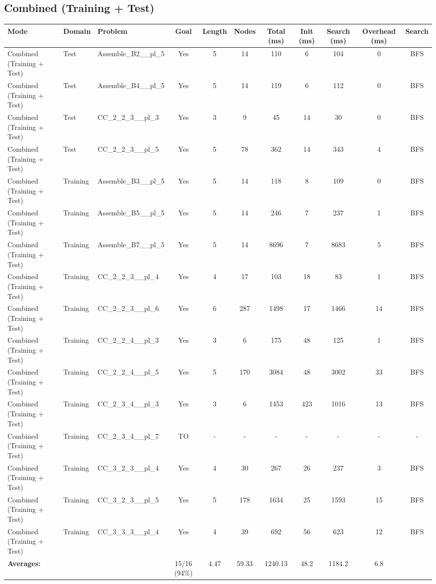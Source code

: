 \documentclass{article}
\begin{document}
\subsection*{Combined (Training + Test)}
\begin{tabular}{lllcccccccc}
\toprule
Mode & Domain & Problem & Goal & Length & Nodes & Total (ms) & Init (ms) & Search (ms) & Overhead (ms) & Search \\
\midrule
Combined (Training + Test) & Test & Assemble\_B2\_\_pl\_5 & Yes & 5 & 14 & 110 & 6 & 104 & 0 & BFS \\
Combined (Training + Test) & Test & Assemble\_B4\_\_pl\_5 & Yes & 5 & 14 & 119 & 6 & 112 & 0 & BFS \\
Combined (Training + Test) & Test & CC\_2\_2\_3\_\_pl\_3 & Yes & 3 & 9 & 45 & 14 & 30 & 0 & BFS \\
Combined (Training + Test) & Test & CC\_2\_2\_3\_\_pl\_5 & Yes & 5 & 78 & 362 & 14 & 343 & 4 & BFS \\
Combined (Training + Test) & Training & Assemble\_B3\_\_pl\_5 & Yes & 5 & 14 & 118 & 8 & 109 & 0 & BFS \\
Combined (Training + Test) & Training & Assemble\_B5\_\_pl\_5 & Yes & 5 & 14 & 246 & 7 & 237 & 1 & BFS \\
Combined (Training + Test) & Training & Assemble\_B7\_\_pl\_5 & Yes & 5 & 14 & 8696 & 7 & 8683 & 5 & BFS \\
Combined (Training + Test) & Training & CC\_2\_2\_3\_\_pl\_4 & Yes & 4 & 17 & 103 & 18 & 83 & 1 & BFS \\
Combined (Training + Test) & Training & CC\_2\_2\_3\_\_pl\_6 & Yes & 6 & 287 & 1498 & 17 & 1466 & 14 & BFS \\
Combined (Training + Test) & Training & CC\_2\_2\_4\_\_pl\_3 & Yes & 3 & 6 & 175 & 48 & 125 & 1 & BFS \\
Combined (Training + Test) & Training & CC\_2\_2\_4\_\_pl\_5 & Yes & 5 & 170 & 3084 & 48 & 3002 & 33 & BFS \\
Combined (Training + Test) & Training & CC\_2\_3\_4\_\_pl\_3 & Yes & 3 & 6 & 1453 & 423 & 1016 & 13 & BFS \\
Combined (Training + Test) & Training & CC\_2\_3\_4\_\_pl\_7 & TO & - & - & - & - & - & - & - \\
Combined (Training + Test) & Training & CC\_3\_2\_3\_\_pl\_4 & Yes & 4 & 30 & 267 & 26 & 237 & 3 & BFS \\
Combined (Training + Test) & Training & CC\_3\_2\_3\_\_pl\_5 & Yes & 5 & 178 & 1634 & 25 & 1593 & 15 & BFS \\
Combined (Training + Test) & Training & CC\_3\_3\_3\_\_pl\_4 & Yes & 4 & 39 & 692 & 56 & 623 & 12 & BFS \\
\textbf{Averages:} & & & 15/16 (94\%) & 4.47 & 59.33 & 1240.13 & 48.2 & 1184.2 & 6.8 & \\
\bottomrule
\end{tabular}
\newpage
\end{document}
